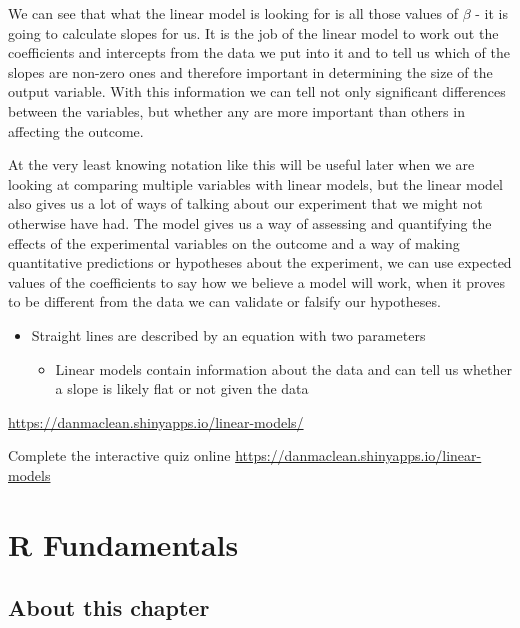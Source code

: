 \documentclass[
]{book}
\providecommand{\tightlist}{%
  \setlength{\itemsep}{0pt}\setlength{\parskip}{0pt}}
\newenvironment{task}
{ \begin{tcolorbox}[title=For you to do,title filled] }
{  \end{tcolorbox} }
\newenvironment{roundup}
{ \begin{tcolorbox}[colbacktitle=yellow!50!white,
title=Round Up,coltitle=black,
fonttitle=\bfseries] }
{  \end{tcolorbox} }
\begin{document}
We can see that what the linear model is looking for is all those values of \(\beta\) - it is going to calculate slopes for us. It is the job of the linear model to work out the coefficients and intercepts from the data we put into it and to tell us which of the slopes are non-zero ones and therefore important in determining the size of the output variable. With this information we can tell not only significant differences between the variables, but whether any are more important than others in affecting the outcome.

At the very least knowing notation like this will be useful later when we are looking at comparing multiple variables with linear models, but the linear model also gives us a lot of ways of talking about our experiment that we might not otherwise have had. The model gives us a way of assessing and quantifying the effects of the experimental variables on the outcome and a way of making quantitative predictions or hypotheses about the experiment, we can use expected values of the coefficients to say how we believe a model will work, when it proves to be different from the data we can validate or falsify our hypotheses.

\begin{roundup}
\begin{itemize}
\tightlist
\item
  Straight lines are described by an equation with two parameters

  \begin{itemize}
  \tightlist
  \item
    Linear models contain information about the data and can tell us whether a slope is likely flat or not given the data
  \end{itemize}
\end{itemize}

\url{https://danmaclean.shinyapps.io/linear-models/}
\end{roundup}

\begin{task}
Complete the interactive quiz online \url{https://danmaclean.shinyapps.io/linear-models}
\end{task}

\hypertarget{r-fundamentals}{%
\chapter{R Fundamentals}\label{r-fundamentals}}

\hypertarget{about-this-chapter}{%
\section{About this chapter}\label{about-this-chapter}}
\end{document}
